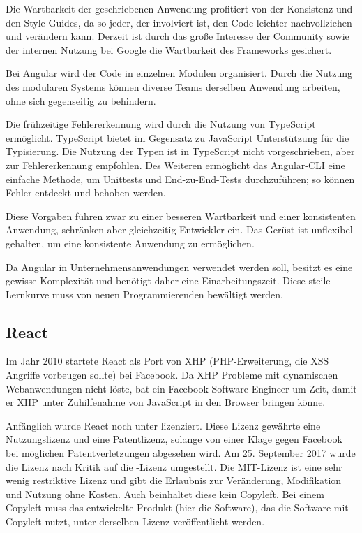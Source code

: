 Die Wartbarkeit der geschriebenen Anwendung profitiert von der Konsistenz und den Style Guides, da so jeder, der involviert ist, den Code leichter nachvollziehen und verändern kann. Derzeit ist durch das große Interesse der Community sowie der internen Nutzung bei Google die Wartbarkeit des Frameworks gesichert. \cite{wahlinWesentlichenVorteileAngular2017}

Bei Angular wird der Code in einzelnen Modulen organisiert. Durch die Nutzung des modularen Systems können diverse Teams derselben Anwendung arbeiten, ohne sich gegenseitig zu behindern. \cite{wahlinWesentlichenVorteileAngular2017}

Die frühzeitige Fehlererkennung wird durch die Nutzung von TypeScript ermöglicht. \linebreak TypeScript bietet im Gegensatz zu JavaScript Unterstützung für die Typisierung. Die Nutzung der Typen ist in TypeScript nicht vorgeschrieben, aber zur Fehlererkennung empfohlen.
Des Weiteren ermöglicht das Angular-CLI eine einfache Methode, um Unittests und End-zu-End-Tests durchzuführen; so können Fehler entdeckt und behoben werden. \cite{wahlinWesentlichenVorteileAngular2017}

Diese Vorgaben führen zwar zu einer besseren Wartbarkeit und einer konsistenten Anwendung, schränken aber gleichzeitig Entwickler ein. Das Gerüst ist unflexibel gehalten, um eine konsistente Anwendung zu ermöglichen.

Da Angular in Unternehmensanwendungen verwendet werden soll, besitzt es eine gewisse Komplexität und benötigt daher eine Einarbeitungszeit. Diese steile Lernkurve muss von neuen Programmierenden bewältigt werden. \cite{ventzkemediaAngularVsReact2018}

\subsection{React}
Im Jahr 2010 startete React als Port von XHP (PHP-Erweiterung, die XSS Angriffe vorbeugen sollte) bei Facebook. Da XHP Probleme mit dynamischen Webanwendungen nicht löste, bat ein Facebook Software-Engineer um Zeit, damit er XHP unter Zuhilfenahme von JavaScript in den Browser bringen könne. \cite{dawsonJavaScriptHistoryHow2014}

Anfänglich wurde React noch unter  lizenziert. Diese Lizenz gewährte eine Nutzungslizenz und eine Patentlizenz, solange von einer Klage gegen Facebook bei möglichen Patentverletzungen abgesehen wird. Am 25. September 2017 wurde die Lizenz nach Kritik auf die -Lizenz umgestellt. \cite{kripalaniIfYouRe2017} \cite{larsonFacebookJustChanged2017} Die MIT-Lizenz ist eine sehr wenig restriktive Lizenz und gibt die Erlaubnis zur Veränderung, Modifikation und Nutzung ohne Kosten. Auch beinhaltet diese kein Copyleft. Bei einem Copyleft muss das entwickelte Produkt (hier die Software), das die Software mit Copyleft nutzt, unter derselben Lizenz veröffentlicht werden. \cite{wehnerSoftwareUnterMIT2020}

